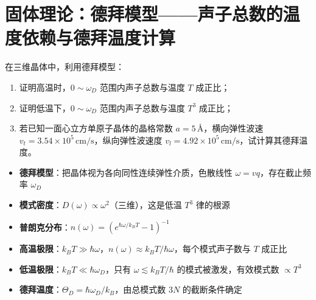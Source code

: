 \section{固体理论：德拜模型——声子总数的温度依赖与德拜温度计算}
\label{sec:debye-phonon-number}

\begin{modelbox}[题目：德拜模型下声子总数的温度依赖与德拜温度]
在三维晶体中，利用德拜模型：
\begin{enumerate}
    \item 证明高温时，$0\sim\omega_D$ 范围内声子总数与温度 $T$ 成正比；
    \item 证明低温下，$0\sim\omega_D$ 范围内声子总数与温度 $T^3$ 成正比；
    \item 若已知一面心立方单原子晶体的晶格常数 $a=5\,\text{\AA}$，横向弹性波速 $v_t=3.54\times10^5\,\mathrm{cm/s}$，纵向弹性波速度 $v_l=4.92\times10^5\,\mathrm{cm/s}$，试计算其德拜温度。
\end{enumerate}
\end{modelbox}

\begin{tipbox}[考点快速分析]
\begin{itemize}
    \item \textbf{德拜模型}：把晶体视为各向同性连续弹性介质，色散线性 $\omega=vq$，存在截止频率 $\omega_D$
    \item \textbf{模式密度}：$D(\omega)\propto\omega^2$（三维），这是低温 $T^3$ 律的根源
    \item \textbf{普朗克分布}：$n(\omega)=(e^{\hbar\omega/k_BT}-1)^{-1}$
    \item \textbf{高温极限}：$k_BT\gg\hbar\omega$，$n(\omega)\approx k_BT/\hbar\omega$，每个模式声子数与 $T$ 成正比
    \item \textbf{低温极限}：$k_BT\ll\hbar\omega_D$，只有 $\omega\lesssim k_BT/\hbar$ 的模式被激发，有效模式数 $\propto T^3$
    \item \textbf{德拜温度}：$\Theta_D=\hbar\omega_D/k_B$，由总模式数 $3N$ 的截断条件确定
\end{itemize}
\end{tipbox}

